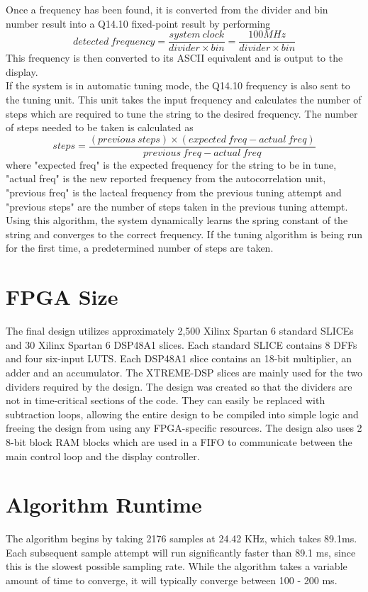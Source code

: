 \documentclass[aps,letterpaper,10pt]{revtex4}
\begin{document}
Once a frequency has been found, it is converted from the divider and bin number result into a Q14.10 fixed-point result by performing 
$$detected~frequency  = \frac{system~clock}{divider \times bin} = \frac{100MHz}{divider \times bin}$$
This frequency is then converted to its ASCII equivalent and is output to the display. \\

If the system is in automatic tuning mode, the Q14.10 frequency is also sent to the tuning unit. This unit takes the input frequency and calculates the number of steps which are required to tune the string to the desired frequency. The number of steps needed to be taken is calculated as
$$steps = \frac{(previous~steps) \times (expected~freq - actual~freq)}{previous~freq - actual~freq}$$
where "expected freq" is the expected frequency for the string to be in tune, "actual freq" is the new reported frequency from the autocorrelation unit, "previous freq" is the lacteal frequency from the previous tuning attempt and "previous steps" are the number of steps taken in the previous tuning attempt. Using this algorithm, the system dynamically learns the spring constant of the string and converges to the correct frequency. If the tuning algorithm is being run for the first time, a predetermined number of steps are taken. 


\section{FPGA Size}

The final design utilizes approximately 2,500 Xilinx Spartan 6 standard SLICEs and 30 Xilinx Spartan 6 DSP48A1 slices. Each standard SLICE contains 8 DFFs and four six-input LUTS. Each DSP48A1 slice contains an 18-bit multiplier, an adder and an accumulator. The XTREME-DSP slices are mainly used for the two dividers required by the design. The design was created so that the dividers are not in time-critical sections of the code. They can easily be replaced with subtraction loops, allowing the entire design to be compiled into simple logic and freeing the design from using any FPGA-specific resources. The design also uses 2 8-bit block RAM blocks which are used in a FIFO to communicate between the main control loop and the display controller. 


\section{Algorithm Runtime}
The algorithm begins by taking 2176 samples at 24.42 KHz, which takes 89.1ms. Each subsequent sample attempt will run significantly faster than 89.1 ms, since this is the slowest possible sampling rate. While the algorithm takes a variable amount of time to converge, it will typically converge between 100 - 200 ms. \\
\end{document}
